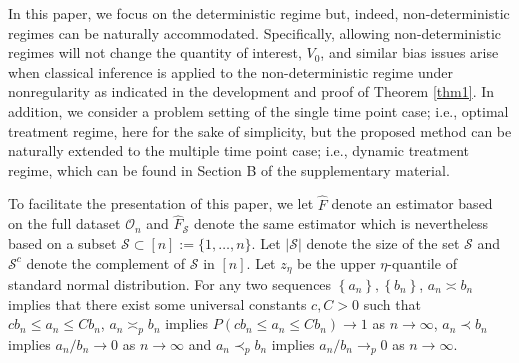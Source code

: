 \documentclass[11pt]{article}
\theoremstyle{referenceplain}
\theoremstyle{referencedefinition}
\theoremstyle{referenceremark}
\begin{document}
In this paper, we focus on the deterministic regime but, indeed, non-deterministic regimes \citep{robins2004optimal} can be naturally accommodated. Specifically, allowing non-deterministic regimes will not change the quantity of interest, $V_0$, and similar bias issues arise when classical inference is applied to the non-deterministic regime under nonregularity as indicated in the development and proof of Theorem \ref{thm1}. In addition, we consider a problem setting of the single time point case; i.e., optimal treatment regime, here for the sake of simplicity, but the proposed method can be naturally extended to the multiple time point case; i.e., dynamic treatment regime, which can be found in Section B of the supplementary material.

To facilitate the presentation of this paper, we let $\widehat{F}$ denote an estimator based on the full dataset $\mathcal{O}_n$ and  $\widehat{F}_{\mathcal{S}}$ denote the same estimator which is nevertheless based on a subset $\mathcal{S}\subset [n]:=\{1,\dots,n\}$. Let $|\mathcal{S}|$ denote the size of the set $\mathcal{S}$ and $\mathcal{S}^c$ denote the complement of $\mathcal{S}$ in $[n]$. Let {$z_{\eta}$} be the upper {$\eta$}-quantile of standard normal distribution. For any two sequences $\left\{a_n\right\},\left\{b_n\right\}$, $a_n \asymp b_n$ implies that there exist some universal constants $c, C>0$ such that $c b_n \leq a_n \leq C b_n$, $a_n \asymp_p b_n$ implies $P(c b_n \leq a_n \leq C b_n)\to 1$ as $n\to\infty$, $a_n\prec b_n$ implies $a_n/b_n\to 0$ as $n\to\infty$ and $a_n\prec_p b_n$ implies $a_n/b_n\to_p 0$ as $n\to\infty$.

\end{document}
